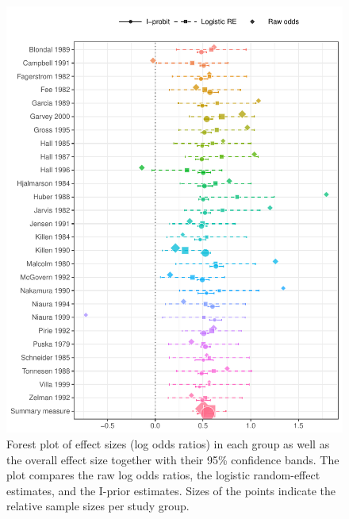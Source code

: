 \documentclass[a4paper,showframe,11pt]{report}\usepackage[]{graphicx}\usepackage[]{color}
\makeatletter
\newenvironment{kframe}{%
 \def\at@end@of@kframe{}%
 \ifinner\ifhmode%
  \def\at@end@of@kframe{\end{minipage}}%
  \begin{minipage}{\columnwidth}%
 \fi\fi%
 \def\FrameCommand##1{\hskip\@totalleftmargin \hskip-\fboxsep
 \colorbox{shadecolor}{##1}\hskip-\fboxsep
     \hskip-\linewidth \hskip-\@totalleftmargin \hskip\columnwidth}%
 \MakeFramed {\advance\hsize-\width
   \@totalleftmargin\z@ \linewidth\hsize
   \@setminipage}}%
 {\par\unskip\endMakeFramed%
 \at@end@of@kframe}
\newenvironment{knitrout}{}{} %
\makeatother
\begin{document}
\begin{knitrout}
\color{fgcolor}\begin{kframe}
\singlespacing\end{kframe}\begin{figure}

{\centering \includegraphics[width=\linewidth]{figure/05-smoke_forest_plot-1} 

}

\caption[Forest plot of effect sizes (log odds ratios) in each group as well as the overall effect size together with their 95\% confidence bands]{Forest plot of effect sizes (log odds ratios) in each group as well as the overall effect size together with their 95\% confidence bands. The plot compares the raw log odds ratios, the logistic random-effect estimates, and the I-prior estimates. Sizes of the points indicate the relative sample sizes per study group.}\label{fig:smoke.forest.plot}
\end{figure}


\end{knitrout}
\end{document}
